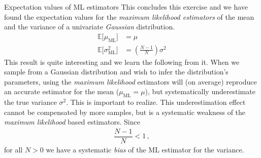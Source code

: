 \documentclass[11pt, DINA4, fleqn]{amsart}
\begin{document}
\begin{mybox_tc3}{Expectation values of ML estimators}
This concludes this exercise and we have found the expectation values for the \emph{maximum likelihood estimators} of the mean and the variance of a univariate \emph{Gaussian} distribution.
\begin{align}
\mathbb{E}\bigl[\mu_{\text{ML}}\bigl] &= \mu \\
\mathbb{E}\bigl[\sigma^2_{\text{ML}}\bigl] &= \left(\frac{N - 1}{N}\right) \sigma^2
\end{align}
This result is quite interesting and we learn the following from it. When we sample from a Gaussian distribution and wish to infer the distribution's parameters, using the \emph{maximum likelihood} estimators will (on average) reproduce an accurate estimator for the mean ($\mu_{\text{ML}}= \mu$), but systematically underestimate the true variance $\sigma^2$. This is important to realize. This underestimation effect cannot be compensated by more samples, but is a systematic weakness of the \emph{maximum likelihood} based estimators.
Since
\begin{align}
\dfrac{N-1}{N} < 1 \, ,
\end{align}
for all $N > 0$ we have a systematic \emph{bias} of the ML estimator for the variance.
\end{mybox_tc3}

\end{document}
